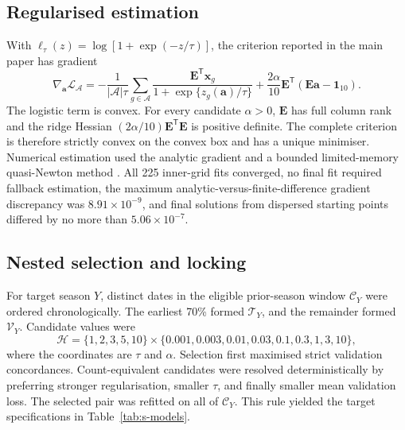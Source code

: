 \documentclass[pdflatex,sn-mathphys-num]{sn-jnl}
\begin{document}
\subsection{Regularised estimation}

With \(\ell_\tau(z)=\log[1+\exp(-z/\tau)]\), the criterion reported in the main paper has gradient
\begin{equation}
\nabla_{\mathbf a}\mathcal L_{\mathcal A}
=-\frac{1}{|\mathcal A|\tau}\sum_{g\in\mathcal A}
\frac{\mathbf E^{\mathsf T}\mathbf x_g}{1+\exp\{z_g(\mathbf a)/\tau\}}
+\frac{2\alpha}{10}\mathbf E^{\mathsf T}(\mathbf E\mathbf a-\mathbf1_{10}).
\label{eq:s-gradient}
\end{equation}
The logistic term is convex. For every candidate \(\alpha>0\), \(\mathbf E\) has full column rank and the ridge Hessian \((2\alpha/10)\mathbf E^{\mathsf T}\mathbf E\) is positive definite. The complete criterion is therefore strictly convex on the convex box and has a unique minimiser. Numerical estimation used the analytic gradient and a bounded limited-memory quasi-Newton method \cite{ByrdEtAl1995}. All 225 inner-grid fits converged, no final fit required fallback estimation, the maximum analytic-versus-finite-difference gradient discrepancy was \(8.91\times10^{-9}\), and final solutions from dispersed starting points differed by no more than \(5.06\times10^{-7}\).

\subsection{Nested selection and locking}

For target season \(Y\), distinct dates in the eligible prior-season window \(\mathcal C_Y\) were ordered chronologically. The earliest 70\% formed \(\mathcal T_Y\), and the remainder formed \(\mathcal V_Y\). Candidate values were
\begin{equation}
\mathcal H=\{1,2,3,5,10\}\times
\{0.001,0.003,0.01,0.03,0.1,0.3,1,3,10\},
\label{eq:s-grid}
\end{equation}
where the coordinates are \(\tau\) and \(\alpha\). Selection first maximised strict validation concordances. Count-equivalent candidates were resolved deterministically by preferring stronger regularisation, smaller \(\tau\), and finally smaller mean validation loss. The selected pair was refitted on all of \(\mathcal C_Y\). This rule yielded the target specifications in Table~\ref{tab:s-models}.
\end{document}
